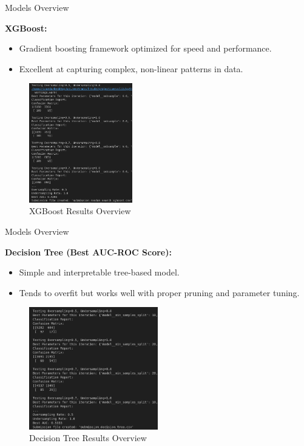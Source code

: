 \documentclass{beamer}
\begin{document}
\begin{frame}{Models Overview}
        \item \textbf{XGBoost:}
        \begin{itemize}
            \item Gradient boosting framework optimized for speed and performance.
            \item Excellent at capturing complex, non-linear patterns in data.
        \end{itemize}
    \begin{figure}
        \centering
        \includegraphics[width=0.4\textwidth]{images/xgb.png} %
        \caption{XGBoost Results Overview}
    \end{figure}
\end{frame}

\begin{frame}{Models Overview}
        \item \textbf{Decision Tree (Best AUC-ROC Score):}
        \begin{itemize}
            \item Simple and interpretable tree-based model.
            \item Tends to overfit but works well with proper pruning and parameter tuning.
        \end{itemize}
    \begin{figure}
        \centering
        \includegraphics[width=0.5\textwidth]{images/dt.png} %
        \caption{Decision Tree Results Overview}
    \end{figure}
\end{frame}
\end{document}
